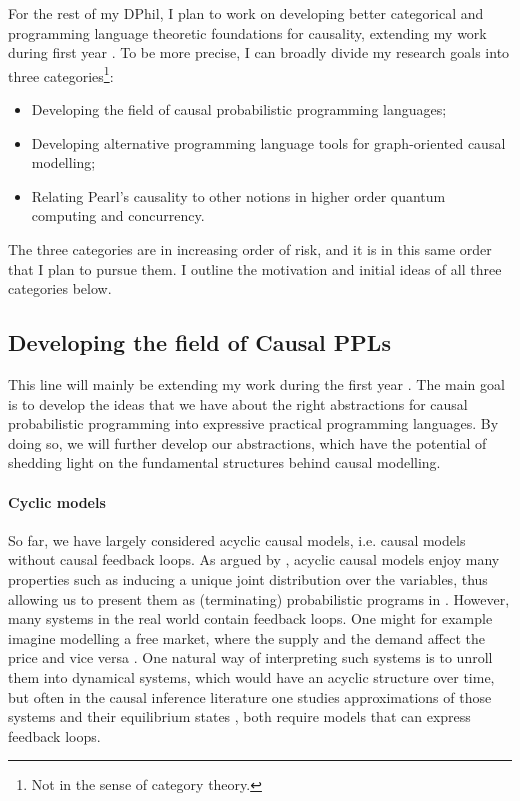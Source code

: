 \documentclass[11pt,a4paper]{article}
\begin{document}
For the rest of my DPhil, I plan to work on developing better categorical and programming language theoretic foundations for causality, extending my work during first year \cite{wang2026causalppl}. To be more precise, I can broadly divide my research goals into three categories\footnote{Not in the sense of category theory.}:
\begin{itemize}
    \item Developing the field of causal probabilistic programming languages;
    \item Developing alternative programming language tools for graph-oriented causal modelling;
    \item Relating Pearl's causality to other notions in higher order quantum computing and concurrency.
\end{itemize}
The three categories are in increasing order of risk, and it is in this same order that I plan to pursue them. I outline the motivation and initial ideas of all three categories below. 

\subsection{Developing the field of Causal PPLs}
This line will mainly be extending my work during the first year \cite{wang2026causalppl}. The main goal is to develop the ideas that we have about the right abstractions for causal probabilistic programming into expressive practical programming languages. By doing so, we will further develop our abstractions, which have the potential of shedding light on the fundamental structures behind causal modelling. 



\paragraph{Cyclic models} So far, we have largely considered acyclic causal models, i.e. causal models without causal feedback loops. As argued by \cite{Bongers_2021}, acyclic causal models enjoy many properties such as inducing a unique joint distribution over the variables, thus allowing us to present them as (terminating) probabilistic programs in \cite{wang2026causalppl}. However, many systems in the real world contain feedback loops. One might for example imagine modelling a free market, where the supply and the demand affect the price and vice versa \cite{Bongers_2021}. One natural way of interpreting such systems is to unroll them into dynamical systems, which would have an acyclic structure over time, but often in the causal inference literature one studies approximations of those systems and their equilibrium states , both require models that can express feedback loops. 
\end{document}
